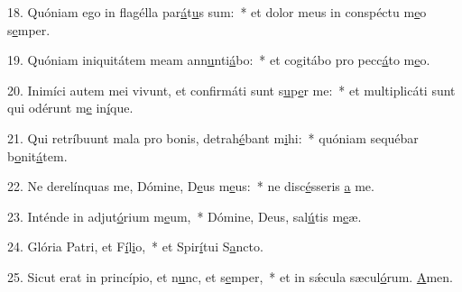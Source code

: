 18. Quóniam ego in flagélla par\uline{á}t\uline{u}s sum:~* et dolor meus in conspéctu m\uline{e}o s\uline{e}mper.\par 
19. Quóniam iniquitátem meam ann\uline{u}nti\uline{á}bo:~* et cogitábo pro pecc\uline{á}to m\uline{e}o.\par 
20. Inimíci autem mei vivunt, et confirmáti sunt s\uline{u}p\uline{e}r me:~* et multiplicáti sunt qui odérunt m\uline{e} in\uline{í}que.\par 
21. Qui retríbuunt mala pro bonis, detrah\uline{é}bant m\uline{i}hi:~* quóniam sequébar b\uline{o}nit\uline{á}tem.\par 
22. Ne derelínquas me, Dómine, D\uline{e}us m\uline{e}us:~* ne disc\uline{é}sseris \uline{a} me.\par 
23. Inténde in adjut\uline{ó}rium m\uline{e}um,~* Dómine, Deus, sal\uline{ú}tis m\uline{e}æ.\par 
24. Glória Patri, et F\uline{í}l\uline{i}o,~* et Spir\uline{í}tui S\uline{a}ncto.\par 
25. Sicut erat in princípio, et n\uline{u}nc, et s\uline{e}mper,~* et in sǽcula sæcul\uline{ó}rum. \uline{A}men.\par 
